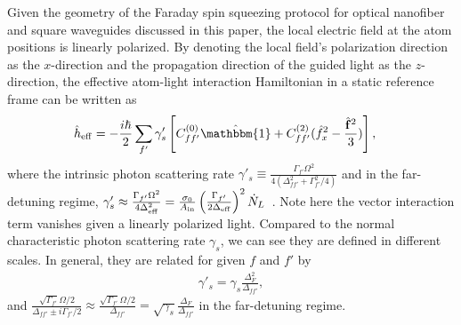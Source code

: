 \documentclass[preprint,aps,pra,onecolumn,superscriptaddress]{revtex4-1} %
\newcommand{\Ain}{A_{\rm in}}
\begin{document}
\begin{appendix}
Given the geometry of the Faraday spin squeezing protocol for optical nanofiber and square waveguides discussed in this paper, the local electric field at the atom positions is linearly polarized. 
By denoting the local field's polarization direction as the $ x$-direction and the propagation direction of the guided light as the $ z $-direction, the effective atom-light interaction Hamiltonian in a static reference frame can be written as 
\begin{align}
\hat{h}_{\rm eff} &= -\frac{i\hbar}{2}\sum_{f'} \gamma'_s \left[C_{ff'}^{(0)}\hat{\mathbbm{1}}+C_{ff'}^{(2)}(\hat{f}_{x}^2-\frac{\hat{\mathbf{f}}^2}{3} ) \right],
\end{align}
where the intrinsic photon scattering rate $ \gamma'_s\equiv \frac{\Gamma_{f'}\Omega^2}{4(\Delta_{ff'}^2+\Gamma_{f'}^2/4 )}$ and in the far-detuning regime, $\gamma'_s \approx \frac{\Gamma_{f'}\Omega^2}{4\Delta_{\rm eff}^2}=\frac{\sigma_0}{\Ain}\left(\frac{\Gamma_{f'}}{2\Delta_{\rm eff}} \right)^2\dot{N}_L $~\cite{Deutsch2010a}. Note here the vector interaction term vanishes given a linearly polarized light.
Compared to the normal characteristic photon scattering rate $ \gamma_s $, we can see they are defined in different scales.
In general, they are related for given $ f $ and $ f' $ by 
\begin{align}
\gamma'_s=\gamma_s \frac{\Delta_F^2}{\Delta_{ff'}},
\end{align}
and $ \frac{\sqrt{\Gamma_{f'}}\Omega/2}{\Delta_{ff'}\pm i\Gamma_{f'}/2}\approx \frac{\sqrt{\Gamma_{f'}}\Omega/2}{\Delta_{ff'}}=\sqrt{\gamma_s}\frac{\Delta_F}{\Delta_{ff'}} $ in the far-detuning regime.


\end{appendix}
\end{document}
